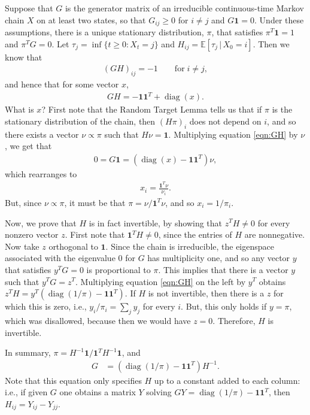 \documentclass{article}
\DeclareMathOperator{\diag}{\mathop{\mbox{diag}}}
\newcommand{\E}{\mathbb{E}}
\newcommand{\bone}{\mathbf{1}}
\begin{document}
Suppose that $G$ is the generator matrix of an irreducible continuous-time Markov chain $X$
on at least two states,
so that $G_{ij} \ge 0$ for $i \neq j$ and $G \bone = 0$.
Under these assumptions, there is a unique stationary distribution, $\pi$,
that satisfies $\pi^T \bone = 1$ and $\pi^T G = 0$.
Let $\tau_{j} = \inf\{t \ge 0 : X_t = j\}$ and $H_{ij} = \E[\tau_j \,|\, X_0 = i]$.
Then we know that
\begin{align*}
    (G H)_{ij} = -1 \qquad \text{for} \; i \neq j ,
\end{align*}
and hence that for some vector $x$,
\begin{align} \label{eqn:GH}
    GH = - \bone \bone^T + \diag(x).
\end{align}
What is $x$?  
First note that the Random Target Lemma \citep{aldous-fill-2014}
tells us that if $\pi$ is the stationary distribution of the chain, then 
$(H \pi)_i$ does not depend on $i$,
and so there exists a vector $\nu \propto \pi$
such that $H \nu = \bone$.
Multiplying equation \eqref{eqn:GH} by $\nu$, we get that
\begin{align*}
    0 = G\bone 
    = (\diag(x) - \bone \bone^T) \nu ,
\end{align*}
which rearranges to
\begin{align*}
    x_i = \frac{ \bone^T \nu }{ \nu_i } .
\end{align*}
But, since $\nu \propto \pi$,
it must be that $\pi = \nu / \bone^T \nu$,
and so $x_i = 1/\pi_i$.

Now, we prove that $H$ is in fact invertible, 
by showing that $z^T H \neq 0$ for every nonzero vector $z$.
First note that $\bone^T H \neq 0$, since the entries of $H$ are nonnegative.
Now take $z$ orthogonal to $\bone$.
Since the chain is irreducible,
the eigenspace associated with the eigenvalue 0 for $G$ has multiplicity one,
and so any vector $y$ that satisfies $y^T G = 0$ is proportional to $\pi$.
This implies that there is a vector $y$ such that $y^T G = z^T$.
Multiplying equation \eqref{eqn:GH} on the left by $y^T$ obtains
$z^T H = y^T (\diag(1/\pi) - \bone \bone^T)$.
If $H$ is not invertible, then there is a $z$ for which this is zero,
i.e., $y_i / \pi_i = \sum_j y_j$ for every $i$.
But, this only holds if $y = \pi$, which was disallowed,
because then we would have $z = 0$.
Therefore, $H$ is invertible.

In summary, $\pi = H^{-1} \bone / \bone^T H^{-1} \bone$, and 
\begin{align}
    G 
    &= (\diag(1/\pi) - \bone \bone^T) H^{-1} .
\end{align}
Note that this equation only specifies $H$ up to a constant added to each column:
i.e., if given $G$ one obtains a matrix $Y$ solving $GY = \diag(1/\pi) - \bone \bone^T$,
then $H_{ij} = Y_{ij} - Y_{jj}$.
\end{document}
